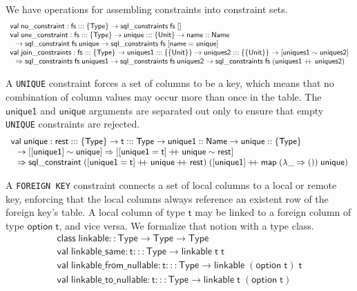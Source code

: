 \documentclass{article}
\newcommand{\mt}[1]{\mathsf{#1}}
\newcommand{\rc}{+ \hspace{-.075in} + \;}
\begin{document}
We have operations for assembling constraints into constraint sets.
$$\begin{array}{l}
  \mt{val} \; \mt{no\_constraint} : \mt{fs} ::: \{\mt{Type}\} \to \mt{sql\_constraints} \; \mt{fs} \; [] \\
  \mt{val} \; \mt{one\_constraint} : \mt{fs} ::: \{\mt{Type}\} \to \mt{unique} ::: \{\mt{Unit}\} \to \mt{name} :: \mt{Name} \\
  \hspace{.1in} \to \mt{sql\_constraint} \; \mt{fs} \; \mt{unique} \to \mt{sql\_constraints} \; \mt{fs} \; [\mt{name} = \mt{unique}] \\
  \mt{val} \; \mt{join\_constraints} : \mt{fs} ::: \{\mt{Type}\} \to \mt{uniques1} ::: \{\{\mt{Unit}\}\} \to \mt{uniques2} ::: \{\{\mt{Unit}\}\} \to [\mt{uniques1} \sim \mt{uniques2}] \\
  \hspace{.1in} \Rightarrow \mt{sql\_constraints} \; \mt{fs} \; \mt{uniques1} \to \mt{sql\_constraints} \; \mt{fs} \; \mt{uniques2} \to \mt{sql\_constraints} \; \mt{fs} \; (\mt{uniques1} \rc \mt{uniques2})
\end{array}$$

A \texttt{UNIQUE} constraint forces a set of columns to be a key, which means that no combination of column values may occur more than once in the table.  The $\mt{unique1}$ and $\mt{unique}$ arguments are separated out only to ensure that empty \texttt{UNIQUE} constraints are rejected.
$$\begin{array}{l}
  \mt{val} \; \mt{unique} : \mt{rest} ::: \{\mt{Type}\} \to \mt{t} ::: \mt{Type} \to \mt{unique1} :: \mt{Name} \to \mt{unique} :: \{\mt{Type}\} \\
  \hspace{.1in} \to [[\mt{unique1}] \sim \mt{unique}] \Rightarrow [[\mt{unique1} = \mt{t}] \rc \mt{unique} \sim \mt{rest}] \\
  \hspace{.1in} \Rightarrow \mt{sql\_constraint} \; ([\mt{unique1} = \mt{t}] \rc \mt{unique} \rc \mt{rest}) \; ([\mt{unique1}] \rc \mt{map} \; (\lambda \_ \Rightarrow ()) \; \mt{unique})
\end{array}$$

A \texttt{FOREIGN KEY} constraint connects a set of local columns to a local or remote key, enforcing that the local columns always reference an existent row of the foreign key's table.  A local column of type $\mt{t}$ may be linked to a foreign column of type $\mt{option} \; \mt{t}$, and vice versa.  We formalize that notion with a type class.
$$\begin{array}{l}
  \mt{class} \; \mt{linkable} :: \mt{Type} \to \mt{Type} \to \mt{Type} \\
  \mt{val} \; \mt{linkable\_same} : \mt{t} ::: \mt{Type} \to \mt{linkable} \; \mt{t} \; \mt{t} \\
  \mt{val} \; \mt{linkable\_from\_nullable} : \mt{t} ::: \mt{Type} \to \mt{linkable} \; (\mt{option} \; \mt{t}) \; \mt{t} \\
  \mt{val} \; \mt{linkable\_to\_nullable} : \mt{t} ::: \mt{Type} \to \mt{linkable} \; \mt{t} \; (\mt{option} \; \mt{t})
\end{array}$$
\end{document}

